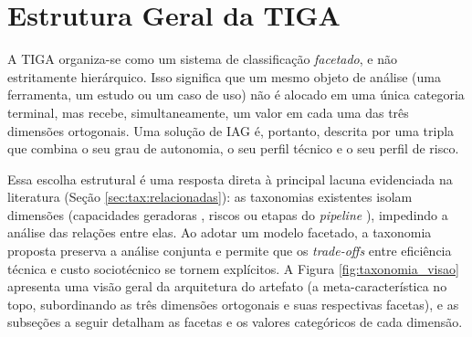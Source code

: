 \section{Estrutura Geral da TIGA}
\label{sec:tax:estrutura}

A TIGA organiza-se como um sistema de classificação \textit{facetado}, e não estritamente hierárquico. Isso significa que um mesmo objeto de análise (uma ferramenta, um estudo ou um caso de uso) não é alocado em uma única categoria terminal, mas recebe, simultaneamente, um valor em cada uma das três dimensões ortogonais. Uma solução de IAG é, portanto, descrita por uma tripla que combina o seu grau de autonomia, o seu perfil técnico e o seu perfil de risco.

Essa escolha estrutural é uma resposta direta à principal lacuna evidenciada na literatura (Seção \ref{sec:tax:relacionadas}): as taxonomias existentes isolam dimensões (capacidades geradoras \citep{strobel2024}, riscos \citep{slattery2024, marchal2024} ou etapas do \textit{pipeline} \citep{orak2024, lazarte2025}), impedindo a análise das relações entre elas. Ao adotar um modelo facetado, a taxonomia proposta preserva a análise conjunta e permite que os \textit{trade-offs} entre eficiência técnica e custo sociotécnico se tornem explícitos. A Figura \ref{fig:taxonomia_visao} apresenta uma visão geral da arquitetura do artefato (a meta-característica no topo, subordinando as três dimensões ortogonais e suas respectivas facetas), e as subseções a seguir detalham as facetas e os valores categóricos de cada dimensão.

